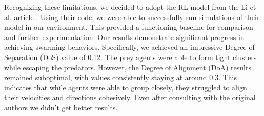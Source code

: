 \documentclass[9pt]{pnas-new}
\begin{document}
Recognizing these limitations, we decided to adopt the RL model from the Li et al. article \cite{li2023predator}.
Using their code, we were able to successfully run simulations of their model in our environment. 
This provided a functioning baseline for comparison and further experimentation.
Our results demonstrate significant progress in achieving swarming behaviors. 
Specifically, we achieved an impressive Degree of Separation (DoS) value of 0.12.
The prey agents were able to form tight clusters while escaping the predators.
However, the Degree of Alignment (DoA) results remained suboptimal, with values consistently staying at around 0.3.
This indicates that while agents were able to group closely, they struggled to align their velocities and directions cohesively. 
Even after consulting with the original authors we didn't get better results.
\end{document}
